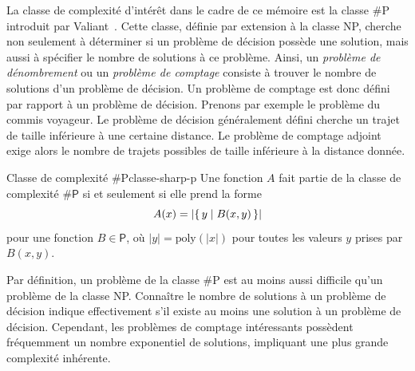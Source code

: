 
La classe de complexité d'intérêt dans le cadre de ce mémoire est la classe \textsf{\#P} introduit par Valiant~\cite{valiantComplexityComputingPermanent1979}. Cette classe, définie par extension à la classe \textsf{NP}, cherche non seulement à déterminer si un problème de décision possède une solution, mais aussi à spécifier le nombre de solutions à ce problème. Ainsi, un \textit{problème de dénombrement} ou un \textit{problème de comptage} consiste à trouver le nombre de solutions d'un problème de décision. Un problème de comptage est donc défini par rapport à un problème de décision. Prenons par exemple le problème du commis voyageur. Le problème de décision généralement défini cherche un trajet de taille inférieure à une certaine distance. Le problème de comptage adjoint exige alors le nombre de trajets possibles de taille inférieure à la distance donnée. 

\begin{maindefinition}{Classe de complexité \textsf{\#P}}{classe-sharp-p}
    Une fonction $A$ fait partie de la classe de complexité $\textsf{\#P}$ si et seulement si elle prend la forme
    \begin{equation*}
        A(x) = \lvert \set{ y \mid B(x, y)} \rvert
    \end{equation*}
    pour une fonction $B \in \textsf{P}$, où $\lvert y \rvert = \mathrm{poly}(\lvert x \rvert)$ pour toutes les valeurs $y$ prises par $B(x,y)$.
\end{maindefinition}


Par définition, un problème de la classe \textsf{\#P} est au moins aussi difficile qu'un problème de la classe \textsf{NP}. Connaître le nombre de solutions à un problème de décision indique effectivement s'il existe au moins une solution à un problème de décision. Cependant, les problèmes de comptage intéressants possèdent fréquemment un nombre exponentiel de solutions, impliquant une plus grande complexité inhérente.



